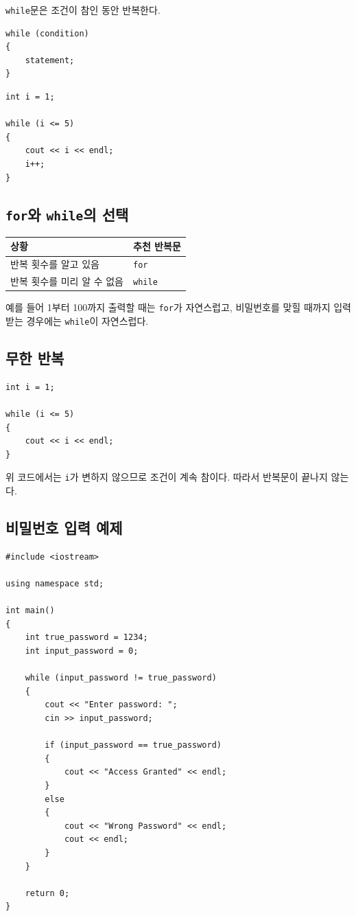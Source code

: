 \documentclass[11pt,a4paper]{article}
\begin{document}
\texttt{while}문은 조건이 참인 동안 반복한다.

\begin{lstlisting}
while (condition)
{
    statement;
}
\end{lstlisting}

\begin{lstlisting}
int i = 1;

while (i <= 5)
{
    cout << i << endl;
    i++;
}
\end{lstlisting}

\subsection{\texttt{for}와 \texttt{while}의 선택}

\begin{center}
\begin{tabular}{ll}
\toprule
상황 & 추천 반복문 \\
\midrule
반복 횟수를 알고 있음 & \texttt{for} \\
반복 횟수를 미리 알 수 없음 & \texttt{while} \\
\bottomrule
\end{tabular}
\end{center}

예를 들어 1부터 100까지 출력할 때는 \texttt{for}가 자연스럽고,
비밀번호를 맞힐 때까지 입력받는 경우에는 \texttt{while}이 자연스럽다.

\subsection{무한 반복}

\begin{lstlisting}
int i = 1;

while (i <= 5)
{
    cout << i << endl;
}
\end{lstlisting}

위 코드에서는 \texttt{i}가 변하지 않으므로 조건이 계속 참이다.
따라서 반복문이 끝나지 않는다.

\subsection{비밀번호 입력 예제}

\begin{lstlisting}
#include <iostream>

using namespace std;

int main()
{
    int true_password = 1234;
    int input_password = 0;

    while (input_password != true_password)
    {
        cout << "Enter password: ";
        cin >> input_password;

        if (input_password == true_password)
        {
            cout << "Access Granted" << endl;
        }
        else
        {
            cout << "Wrong Password" << endl;
            cout << endl;
        }
    }

    return 0;
}
\end{lstlisting}
\end{document}
